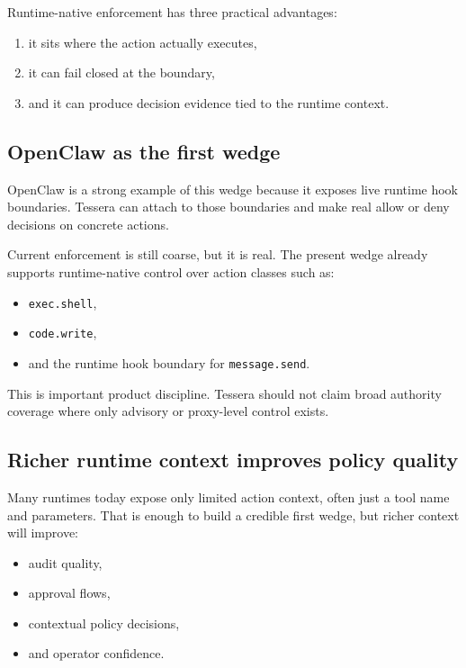 \documentclass[11pt, a4paper]{article}
\begin{document}
Runtime-native enforcement has three practical advantages:

\begin{enumerate}
  \item it sits where the action actually executes,
  \item it can fail closed at the boundary,
  \item and it can produce decision evidence tied to the runtime context.
\end{enumerate}

\subsection{OpenClaw as the first wedge}

OpenClaw is a strong example of this wedge because it exposes live runtime hook boundaries. Tessera can attach to those boundaries and make real allow or deny decisions on concrete actions.

Current enforcement is still coarse, but it is real. The present wedge already supports runtime-native control over action classes such as:

\begin{itemize}
  \item \texttt{exec.shell},
  \item \texttt{code.write},
  \item and the runtime hook boundary for \texttt{message.send}.
\end{itemize}

This is important product discipline. Tessera should not claim broad authority coverage where only advisory or proxy-level control exists.

\subsection{Richer runtime context improves policy quality}

Many runtimes today expose only limited action context, often just a tool name and parameters. That is enough to build a credible first wedge, but richer context will improve:

\begin{itemize}
  \item audit quality,
  \item approval flows,
  \item contextual policy decisions,
  \item and operator confidence.
\end{itemize}
\end{document}
